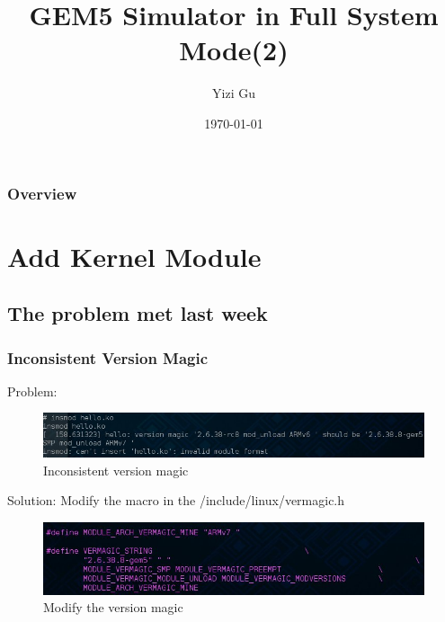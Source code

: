 \documentclass{beamer}
\title[Group Meeting Talk]{GEM5 Simulator in Full System Mode(2)} %
\author{Yizi Gu} %
\institute[Department of EE,THU] %
{
Tsinghua University\\ %
\medskip
\textit{yizigu@gmail.com} %
}
\date{\today} %
\begin{document}
\begin{frame}
\titlepage %
\end{frame}

\begin{frame}
\frametitle{Overview} %
\tableofcontents %
\end{frame}


\section{Add Kernel Module} %
\subsection{The problem met last week}
\begin{frame}
\frametitle{Inconsistent Version Magic}
    Problem:
	\begin{figure}[H]
	    \begin{center}
		\includegraphics[scale=0.5]{back12.jpg}
	    \end{center}
	    \caption{Inconsistent version magic}
	    \label{fig:vermagic}
	\end{figure}
    Solution: Modify the macro in the /include/linux/vermagic.h
	\begin{figure}[H]
	    \begin{center}
		\includegraphics[scale=0.5]{back14.jpg}
	    \end{center}
	    \caption{Modify the version magic}
	    \label{fig:modify}
	\end{figure}
\end{frame}
\end{document}
